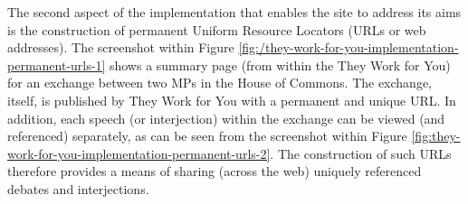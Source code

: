 The second aspect of the implementation that enables the site to address its aims is the construction of permanent Uniform Resource Locators (URLs or web addresses).
The screenshot within Figure \ref{fig:/they-work-for-you-implementation-permanent-urls-1} shows a summary page (from within the They Work for You) for an exchange between two MPs in the House of Commons. 
The exchange, itself, is published by They Work for You with a permanent and unique URL.
In addition, each speech (or interjection) within the exchange can be viewed (and referenced) separately, as can be seen from the screenshot within Figure \ref{fig:they-work-for-you-implementation-permanent-urls-2}.
The construction of such URLs therefore provides a means of sharing (across the web) uniquely referenced debates and interjections.
